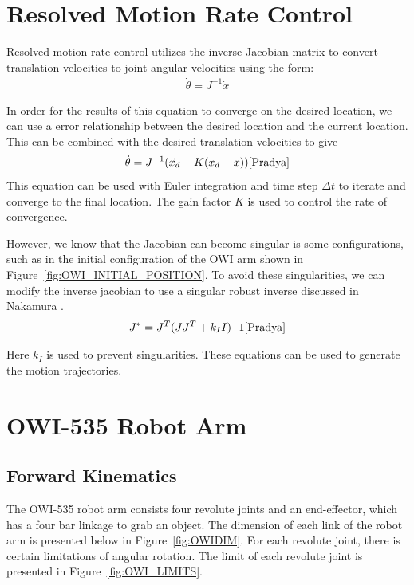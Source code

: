 \documentclass[paper=letter, fontsize=10pt]{scrartcl}	%
\numberwithin{equation}{section}															%
\numberwithin{figure}{section}																%
\numberwithin{table}{section}																%
\begin{document}
\section{Resolved Motion Rate Control}
\label{sec:RMRC}

Resolved motion rate control utilizes the inverse Jacobian matrix to convert translation velocities to joint angular velocities using the form:
\begin{align}
\dot{\theta}=J^{-1}\dot{x}
\end{align}

In order for the results of this equation to converge on the desired location, we can use a error relationship between the desired location and the current location. This can be combined with the desired translation velocities to give
\begin{align}
\dot{\theta}=J^{-1}(\dot{x_d}+K(x_d-x))
\cite{Pradya}
\end{align}
This equation can be used with Euler integration and time step $\Delta t$ to iterate and converge to the final location. The gain factor $K$ is used to control the rate of convergence.

However, we know that the Jacobian can become singular is some configurations, such as in the initial configuration of the OWI arm shown in Figure~\ref{fig:OWI_INITIAL_POSITION}. To avoid these singularities, we can modify the inverse jacobian to use a singular robust inverse discussed in Nakamura \cite{nakamura1986inverse}.
\begin{align}
J^*=J^T(J J^T+k_I I){^-1}
\cite{Pradya}
\end{align}

Here $k_I$ is used to prevent singularities. These equations can be used to generate the motion trajectories. 

\section{OWI-535 Robot Arm}
\subsection{Forward Kinematics}

The OWI-535 robot arm consists four revolute joints and an end-effector, which has a four bar linkage to grab an object. The dimension of each link of the robot arm is presented below in Figure~\ref{fig:OWIDIM}. For each revolute joint, there is certain limitations of angular rotation. The limit of each revolute joint is presented in Figure~\ref{fig:OWI_LIMITS}.
\end{document}
